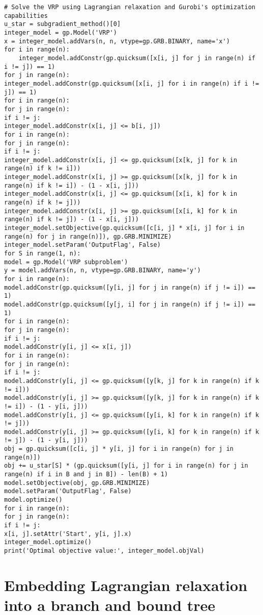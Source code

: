 \begin{verbatim}
# Solve the VRP using Lagrangian relaxation and Gurobi's optimization capabilities
u_star = subgradient_method()[0]
integer_model = gp.Model('VRP')
x = integer_model.addVars(n, n, vtype=gp.GRB.BINARY, name='x')
for i in range(n):
    integer_model.addConstr(gp.quicksum([x[i, j] for j in range(n) if i != j]) == 1)
for j in range(n):
integer_model.addConstr(gp.quicksum([x[i, j] for i in range(n) if i != j]) == 1)
for i in range(n):
for j in range(n):
if i != j:
integer_model.addConstr(x[i, j] <= b[i, j])
for i in range(n):
for j in range(n):
if i != j:
integer_model.addConstr(x[i, j] <= gp.quicksum([x[k, j] for k in range(n) if k != i]))
integer_model.addConstr(x[i, j] >= gp.quicksum([x[k, j] for k in range(n) if k != i]) - (1 - x[i, j]))
integer_model.addConstr(x[i, j] <= gp.quicksum([x[i, k] for k in range(n) if k != j]))
integer_model.addConstr(x[i, j] >= gp.quicksum([x[i, k] for k in range(n) if k != j]) - (1 - x[i, j]))
integer_model.setObjective(gp.quicksum([c[i, j] * x[i, j] for i in range(n) for j in range(n)]), gp.GRB.MINIMIZE)
integer_model.setParam('OutputFlag', False)
for S in range(1, n):
model = gp.Model('VRP subproblem')
y = model.addVars(n, n, vtype=gp.GRB.BINARY, name='y')
for i in range(n):
model.addConstr(gp.quicksum([y[i, j] for j in range(n) if j != i]) == 1)
model.addConstr(gp.quicksum([y[j, i] for j in range(n) if j != i]) == 1)
for i in range(n):
for j in range(n):
if i != j:
model.addConstr(y[i, j] <= x[i, j])
for i in range(n):
for j in range(n):
if i != j:
model.addConstr(y[i, j] <= gp.quicksum([y[k, j] for k in range(n) if k != i]))
model.addConstr(y[i, j] >= gp.quicksum([y[k, j] for k in range(n) if k != i]) - (1 - y[i, j]))
model.addConstr(y[i, j] <= gp.quicksum([y[i, k] for k in range(n) if k != j]))
model.addConstr(y[i, j] >= gp.quicksum([y[i, k] for k in range(n) if k != j]) - (1 - y[i, j]))
obj = gp.quicksum([c[i, j] * y[i, j] for i in range(n) for j in range(n)])
obj += u_star[S] * (gp.quicksum([y[i, j] for i in range(n) for j in range(n) if i in B and j in B]) - len(B) + 1)
model.setObjective(obj, gp.GRB.MINIMIZE)
model.setParam('OutputFlag', False)
model.optimize()
for i in range(n):
for j in range(n):
if i != j:
x[i, j].setAttr('Start', y[i, j].x)
integer_model.optimize()
print('Optimal objective value:', integer_model.objVal)

\end{verbatim}


\section{Embedding Lagrangian relaxation into a branch and bound tree}

